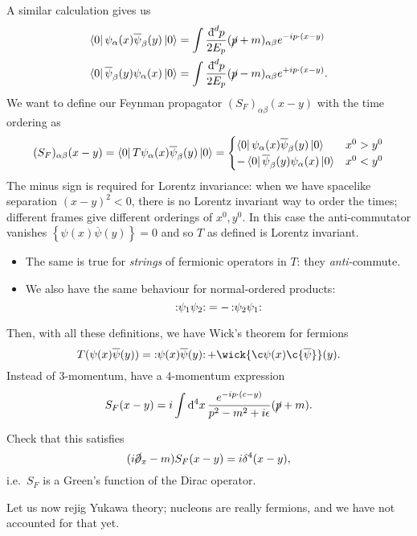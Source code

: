 A similar calculation gives us
\begin{align}
  \bra{0} \psi_{\alpha}(x) \overline{\psi}_{\beta}(y) \ket{0} &= \int \frac{\bdd[d]{p}}{2 E_p} (\cancel{p} + m)_{\alpha\beta} e^{-i p \cdot (x - y)} \\
  \bra{0} \overline{\psi}_{\beta}(y)\psi_{\alpha}(x)  \ket{0} &= \int \frac{\bdd[d]{p}}{2 E_p} (\cancel{p} - m)_{\alpha\beta} e^{+i p \cdot (x - y)} .
\end{align}
We want to define our Feynman propagator $(S_F)_{\alpha\beta}(x - y)$ with the time ordering as
\begin{equation}
  (S_F)_{\alpha\beta}(x - y) = \bra{0} T \psi_{\alpha}(x) \overline{\psi} _{\beta}(y) \ket{0} = 
  \begin{cases}
    \bra{0} \psi_{\alpha}(x) \overline{\psi}_{\beta}(y) \ket{0} & x^0> y^0 \\
    -\bra{0} \overline{\psi}_{\beta}(y)\psi_{\alpha}(x)  \ket{0} & x^0 < y^0 \\
  \end{cases}
\end{equation}
The minus sign is required for Lorentz invariance: when we have spacelike separation $(x - y)^2 < 0$, there is no Lorentz invariant way to order the times; different frames give different orderings of $x^0, y^0$.
In this case the anti-commutator vanishes $\left\{ \psi(x) \overline{\psi}(y) \right\} = 0$ and so $T$ as defined is Lorentz invariant.
\begin{itemize}
  \item The same is true for \emph{strings} of fermionic operators in $T$: they \emph{anti-}commute.
  \item We also have the same behaviour for normal-ordered products:
    \begin{equation}
      \normalorder{\psi_1 \psi_2} = - \normalorder{\psi_2 \psi_1}
    \end{equation}
\end{itemize}
Then, with all these definitions, we have Wick's theorem for fermions
\begin{equation}
  T(\psi(x) \overline{\psi}(y))  =\normalorder{\psi(x) \overline{\psi}(y)} + \wick{\c\psi(x) \c{\overline{\psi}}}(y).
\end{equation}
Instead of $3$-momentum, have a $4$-momentum expression
\begin{equation}
  S_F(x - y) = i \int \dd[4]{x} \frac{e^{-i p \cdot (c - y)}}{p^2 - m^2 + i \epsilon} (\cancel{p} + m).
\end{equation}
\begin{exercise}
  Check that this satisfies
  \begin{equation}
    (i \cancel{\partial}_x - m) S_F ( x - y) = i \delta^4 (x - y),
  \end{equation}
  i.e.~$S_F$ is a Green's function of the Dirac operator.
\end{exercise}
Let us now rejig Yukawa theory; nucleons are really fermions, and we have not accounted for that yet.

